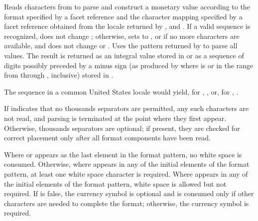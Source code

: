 \begin{itemdescr}
\pnum
\effects
Reads characters from
to parse and construct a monetary value according to the
format specified by a
facet reference
and the character mapping specified by a
facet reference
obtained from the locale returned by
,
and
.
If a valid sequence is recognized,
does not change ;
otherwise, sets  to
,
or
if no more characters are available,
and does not change  or .
Uses the pattern returned by
to parse all values.
The result is returned as an integral value stored in
or as a sequence of digits possibly preceded by a minus sign
(as produced by
where
is
or in the range from
through
,
inclusive)
stored in
.
\begin{example}
The sequence
in a common United States locale would yield, for
,
,
or, for
,
.
\end{example}
If
indicates that no thousands separators are permitted,
any such characters are not read, and parsing is terminated at the point
where they first appear.
Otherwise, thousands separators are optional;
if present, they are checked for correct placement only after
all format components have been read.

\pnum
Where
or
appears as the last element in the format pattern,
no white space is consumed. Otherwise, where  appears in any of the
initial elements of the format pattern, at least one white space character is required. Where
 appears in any of the initial elements of the format pattern, white
space is allowed but not required.
If
is false, the currency symbol is optional and is consumed only if
other characters are needed to complete the format;
otherwise, the currency symbol is required.


\end{itemdescr}
